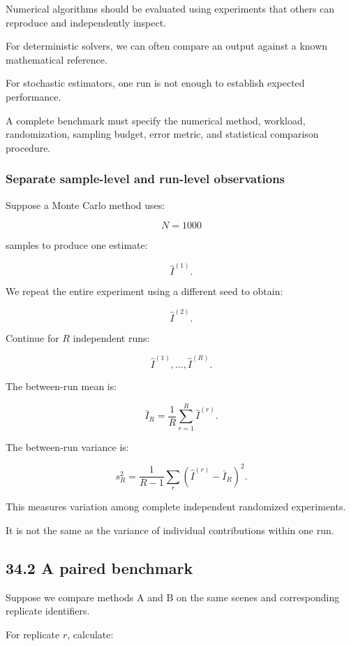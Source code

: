 Numerical algorithms should be evaluated using experiments that others can reproduce and independently inspect.

For deterministic solvers, we can often compare an output against a known mathematical reference.

For stochastic estimators, one run is not enough to establish expected performance.

A complete benchmark must specify the numerical method, workload, randomization, sampling budget, error metric, and statistical comparison procedure.

\subsubsection{Separate sample-level and run-level observations}\label{02-foundations-ii-ch031-separate-sample-level-and-run-level-observations}

Suppose a Monte Carlo method uses:

\[ N=1000 \]

samples to produce one estimate:

\[ \widehat I^{(1)}. \]

We repeat the entire experiment using a different seed to obtain:

\[ \widehat I^{(2)}. \]

Continue for \(R\) independent runs:

\[ \widehat I^{(1)},\ldots,\widehat I^{(R)}. \]

The between-run mean is:

\[ \bar I_R= \frac1R\sum_{r=1}^{R}\widehat I^{(r)}. \]

The between-run variance is:

\[ s_R^2= \frac1{R-1} \sum_r(\widehat I^{(r)}-\bar I_R)^2. \]

This measures variation among complete independent randomized experiments.

It is not the same as the variance of individual contributions within one run.

\subsection{34.2 A paired benchmark}\label{02-foundations-ii-ch031-a-paired-benchmark}

Suppose we compare methods A and B on the same scenes and corresponding replicate identifiers.

For replicate \(r\), calculate:


